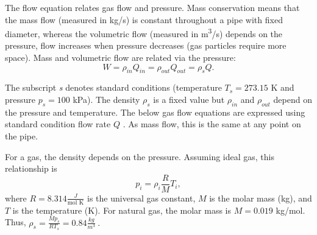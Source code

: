 \documentclass[12pt]{article}
\begin{document}
The flow equation relates gas flow and pressure. Mass conservation means that the mass flow (measured in kg/s) is constant throughout a pipe with fixed diameter, whereas the volumetric flow (measured in m\textsuperscript{3}/s) depends on the pressure, flow increases when pressure decreases (gas particles require more space). Mass and volumetric flow are related via the pressure:
\begin{equation}
	W= \rho _{in}Q_{in}= \rho _{out}Q_{out}= \rho _{s}Q. 
\end{equation}


The subscript \textit{s} denotes standard conditions (temperature  \( T_{s}=273.15 \)  K and pressure  \( p_{s}=100 \)  kPa). The density  \(  \rho _{s} \)  is a fixed value but  \(  \rho _{in} \)  and  \(  \rho _{out} \)  depend on the pressure and temperature. The below gas flow equations are expressed using standard condition flow rate  \( Q \) . As mass flow, this is the same at any point on the pipe.


For a gas, the density depends on the pressure. Assuming ideal gas, this relationship is 
\begin{equation}
	p_{i}= \rho _{i}\frac{R}{M}T_{i}, 
\end{equation}
%
where  \( R=8.314\frac{J}{\text{mol K}} \)  is the universal gas constant,  \( M \)  is the molar mass (kg), and  \( T \)  is the temperature (K). For natural gas, the molar mass is  \( M=0.019 \)  kg/mol. Thus,  
\(  \rho _{s}=\frac{Mp_{s}}{RT_{s}}=0.84\frac{kg}{m^{3}}~. \) 
\end{document}

